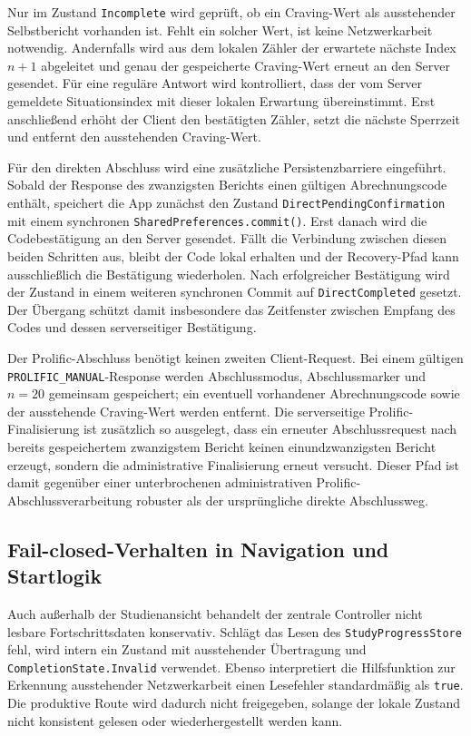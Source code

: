 \begin{neu}
Nur im Zustand \texttt{Incomplete} wird geprüft, ob ein Craving-Wert als ausstehender Selbstbericht vorhanden ist. Fehlt ein solcher Wert, ist keine Netzwerkarbeit notwendig. Andernfalls wird aus dem lokalen Zähler der erwartete nächste Index \(n+1\) abgeleitet und genau der gespeicherte Craving-Wert erneut an den Server gesendet. Für eine reguläre Antwort wird kontrolliert, dass der vom Server gemeldete Situationsindex mit dieser lokalen Erwartung übereinstimmt. Erst anschließend erhöht der Client den bestätigten Zähler, setzt die nächste Sperrzeit und entfernt den ausstehenden Craving-Wert.

Für den direkten Abschluss wird eine zusätzliche Persistenzbarriere eingeführt. Sobald der Response des zwanzigsten Berichts einen gültigen Abrechnungscode enthält, speichert die App zunächst den Zustand \texttt{DirectPendingConfirmation} mit einem synchronen \texttt{SharedPreferences.commit()}. Erst danach wird die Codebestätigung an den Server gesendet. Fällt die Verbindung zwischen diesen beiden Schritten aus, bleibt der Code lokal erhalten und der Recovery-Pfad kann ausschließlich die Bestätigung wiederholen. Nach erfolgreicher Bestätigung wird der Zustand in einem weiteren synchronen Commit auf \texttt{DirectCompleted} gesetzt. Der Übergang schützt damit insbesondere das Zeitfenster zwischen Empfang des Codes und dessen serverseitiger Bestätigung.

Der Prolific-Abschluss benötigt keinen zweiten Client-Request. Bei einem gültigen \texttt{PROLIFIC\_MANUAL}-Response werden Abschlussmodus, Abschlussmarker und \(n=20\) gemeinsam gespeichert; ein eventuell vorhandener Abrechnungscode sowie der ausstehende Craving-Wert werden entfernt. Die serverseitige Prolific-Finalisierung ist zusätzlich so ausgelegt, dass ein erneuter Abschlussrequest nach bereits gespeichertem zwanzigstem Bericht keinen einundzwanzigsten Bericht erzeugt, sondern die administrative Finalisierung erneut versucht. Dieser Pfad ist damit gegenüber einer unterbrochenen administrativen Prolific-Abschlussverarbeitung robuster als der ursprüngliche direkte Abschlussweg.

\subsection{Fail-closed-Verhalten in Navigation und Startlogik}

Auch außerhalb der Studienansicht behandelt der zentrale Controller nicht lesbare Fortschrittsdaten konservativ. Schlägt das Lesen des \texttt{StudyProgressStore} fehl, wird intern ein Zustand mit ausstehender Übertragung und \texttt{CompletionState.Invalid} verwendet. Ebenso interpretiert die Hilfsfunktion zur Erkennung ausstehender Netzwerkarbeit einen Lesefehler standardmäßig als \texttt{true}. Die produktive Route wird dadurch nicht freigegeben, solange der lokale Zustand nicht konsistent gelesen oder wiederhergestellt werden kann.


\end{neu}
